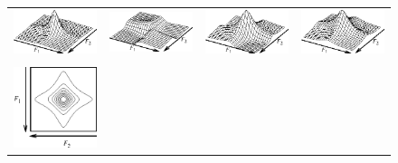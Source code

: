 \documentclass[11pt,a4paper]{article}
\begin{document}
\begin{figure}
\begin{center}

\begin{tabular}{llll}
\includegraphics[scale=0.9]{surf1.eps} & 
\includegraphics[scale=0.9]{surf2.eps} & 
\includegraphics[scale=0.9]{surf3.eps} & 
\includegraphics[scale=0.9]{surf4.eps} \\
\rule[0mm]{0mm}{2mm} \\
\includegraphics[scale=0.9]{cont1.eps} & 

\end{tabular}
\end{center}
\end{figure}
\end{document}
